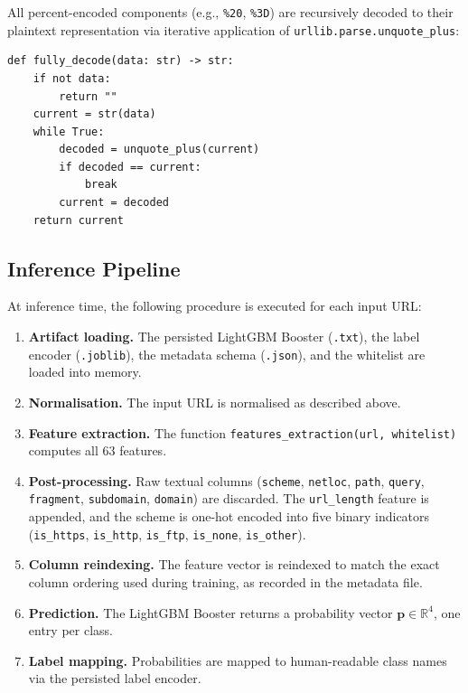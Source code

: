 \documentclass[a4paper,12pt]{article}
\begin{document}
All percent-encoded components (e.g., \texttt{\%20}, \texttt{\%3D}) are recursively decoded to their plaintext representation via iterative application of \texttt{urllib.parse.unquote\_plus}:

\begin{lstlisting}[caption={Recursive percent-decoding}]
def fully_decode(data: str) -> str:
    if not data:
        return ""
    current = str(data)
    while True:
        decoded = unquote_plus(current)
        if decoded == current:
            break
        current = decoded
    return current
\end{lstlisting}

\subsection{Inference Pipeline}

At inference time, the following procedure is executed for each input URL:

\begin{enumerate}
    \item \textbf{Artifact loading.} The persisted LightGBM Booster (\texttt{.txt}), the label encoder (\texttt{.joblib}), the metadata schema (\texttt{.json}), and the whitelist are loaded into memory.
    \item \textbf{Normalisation.} The input URL is normalised as described above.
    \item \textbf{Feature extraction.} The function \texttt{features\_extraction(url, whitelist)} computes all 63 features.
    \item \textbf{Post-processing.} Raw textual columns (\texttt{scheme}, \texttt{netloc}, \texttt{path}, \texttt{query}, \texttt{fragment}, \texttt{subdomain}, \texttt{domain}) are discarded. The \texttt{url\_length} feature is appended, and the scheme is one-hot encoded into five binary indicators (\texttt{is\_https}, \texttt{is\_http}, \texttt{is\_ftp}, \texttt{is\_none}, \texttt{is\_other}).
    \item \textbf{Column reindexing.} The feature vector is reindexed to match the exact column ordering used during training, as recorded in the metadata file.
    \item \textbf{Prediction.} The LightGBM Booster returns a probability vector $\mathbf{p} \in \mathbb{R}^4$, one entry per class.
    \item \textbf{Label mapping.} Probabilities are mapped to human-readable class names via the persisted label encoder.
\end{enumerate}
\end{document}
